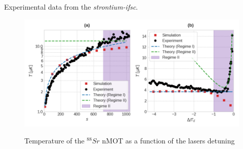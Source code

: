 Experimental data from the \textit{strontium-ifsc}.

\begin{figure}[!ht]
    \centering
    \caption{Temperature of the ${}^{88}Sr$ nMOT as a function of the lasers detuning}
    \includegraphics[width=1.0\textwidth]{USPSC-img/sr_temperature.png}
    \vspace{5px}
    \label{fig:sr-temperature}
\end{figure}
